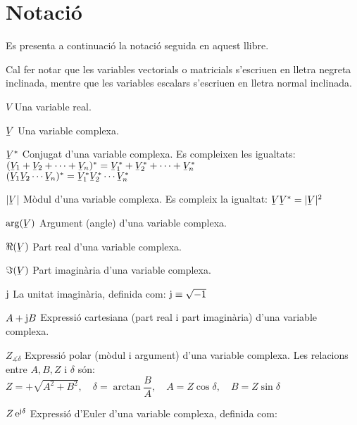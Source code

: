 \chapter*{Notaci\'{o}} 

Es presenta a continuaci\'{o} la notaci\'{o} seguida en aquest llibre.

Cal fer notar que les variables vectorials o matricials s'escriuen
en lletra negreta inclinada,  mentre que les variables escalars
s'escriuen en lletra normal inclinada.

\begin{list}{}
{\setlength{\labelwidth}{15mm} \setlength{\leftmargin}{25mm}
\setlength{\labelsep}{10mm}}
    \item[$V$] Una variable real.
    \item[$\cmplx{V}$] Una variable complexa.
    \item[$\cmplx{V}^*$] Conjugat d'una variable complexa.
    Es compleixen les igualtats:\\[1ex]
     $(\cmplx{V}_1+\cmplx{V}_2+\cdots+\cmplx{V}_n)^* = \cmplx{V}_1^* +
    \cmplx{V}_2^*+\cdots+\cmplx{V}_n^*$\\[1ex]
    $(\cmplx{V}_1 \cmplx{V}_2 \cdots \cmplx{V}_n)^* = \cmplx{V}_1^*  \cmplx{V}_2^*
    \cdots \cmplx{V}_n^*$
    \item[$|\cmplx{V}|$] M\`{o}dul d'una variable complexa.
    Es compleix la igualtat:  $\cmplx{V}\cmplx{V}^* = |\cmplx{V}|^2$
    \item[$\arg(\cmplx{V})$] Argument (angle) d'una variable complexa.
    \item[$\Re(\cmplx{V})$] Part real d'una variable complexa.
    \item[$\Im(\cmplx{V})$] Part imagin\`{a}ria d'una variable complexa.
    \item[$\mathrm{j}$] La unitat imagin\`{a}ria, definida com:
    $\mathrm{j}\equiv\sqrt{-1}$
    \item[$A+\mathrm{j} B$] Expressi\'{o} cartesiana (part real i part
    imagin\`{a}ria) d'una variable complexa.
    \item[$Z_{\measuredangle \delta}$] Expressi\'{o} polar (m\`{o}dul i argument) d'una variable
    complexa. Les relacions entre $A, B, Z$ i $\delta$ s\'{o}n:\\[1ex]
    $Z=+\sqrt{A^2+B^2},\quad\delta=\arctan{\dfrac{B}{A}},\quad
    A=Z\cos\delta,\quad B=Z\sin\delta$
    \item[$Z\,\mathrm{e}^{\mathrm{j}\delta}$] Expressi\'{o} d'Euler d'una variable complexa, definida com:

\end{list}
